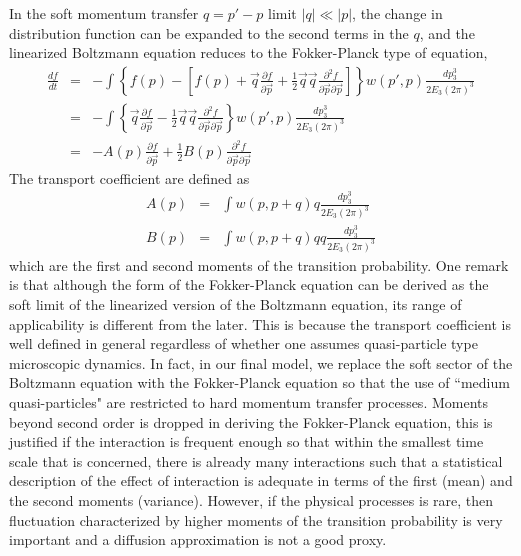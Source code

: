 In the soft momentum transfer $q = p'-p$ limit  $|q| \ll |p|$, the change in distribution function can be expanded to the second terms in the $q$, and the linearized Boltzmann equation reduces to the Fokker-Planck type of equation,
\begin{eqnarray}
\frac{df}{dt} &=& - \int \left\{
f(p) - \left[f(p) +  \vec{q}\frac{\partial f}{\partial\vec{p}} + \frac{1}{2}\vec{q}\vec{q}\frac{\partial^2 f}{\partial\vec{p} \partial\vec{p}} \right]
\right\} w(p',p)\frac{dp_3^3}{2E_3 (2\pi)^3} \\
&=& - \int \left\{ \vec{q}\frac{\partial f}{\partial\vec{p}} - \frac{1}{2}\vec{q}\vec{q}\frac{\partial^2 f}{\partial\vec{p} \partial\vec{p}}
\right\} w(p',p)\frac{dp_3^3}{2E_3 (2\pi)^3} \\
&=&  -A(p) \frac{\partial f}{\partial\vec{p}} + \frac{1}{2}B(p)\frac{\partial^2 f}{\partial\vec{p} \partial\vec{p}}
\end{eqnarray}
The transport coefficient are defined as
\begin{eqnarray}
A(p) &=& \int w(p,p+q) q \frac{dp_3^3}{2E_3 (2\pi)^3}\\
B(p) &=& \int w(p,p+q) q q \frac{dp_3^3}{2E_3 (2\pi)^3}
\end{eqnarray}
which are the first and second moments of the transition probability.
One remark is that although the form of the Fokker-Planck equation can be derived as the soft limit of the linearized version of the Boltzmann equation, its range of applicability is different from the later.
This is because the transport coefficient is well defined in general regardless of whether one assumes quasi-particle type microscopic dynamics.
In fact, in our final model, we replace the soft sector of the Boltzmann equation with the Fokker-Planck equation so that the use of ``medium quasi-particles" are restricted to hard momentum transfer processes.
Moments beyond second order is dropped in deriving the Fokker-Planck equation, this is justified if the interaction is frequent enough so that within the smallest time scale that is concerned, there is already many interactions such that a statistical description of the effect of interaction is adequate in terms of the first (mean) and the second moments (variance).
However, if the physical processes is rare, then fluctuation characterized by higher moments of the transition probability is very important and a diffusion approximation is not a good proxy.

